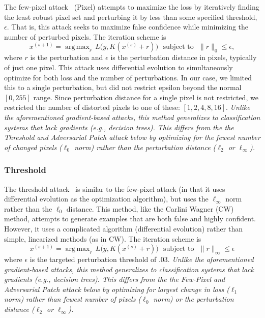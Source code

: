 \documentclass[journal]{IEEEtran}
\DeclareMathOperator*{\argmax}{arg\,max}
\newcommand{\cm}[1]{\textit{{\color{blue}#1}}}
\begin{document}
The few-pixel attack~\cite{pixelattack} (Pixel) attempts to maximize the loss by iteratively finding the least robust pixel set and perturbing it by less than some specified threshold, $\epsilon$. 
That is, this attack seeks to maximize false confidence while minimizing the number of perturbed pixels.
The iteration scheme is
$$
    x^{(s+1)} = \argmax_r \, L\big(y, K(x^{(s)} + r)\big) \text{~~subject~to~~}  \|r\|_0 \leq \epsilon,
$$
where $r$ is the perturbation and $\epsilon$ is the perturbation distance in pixels, typically of just one pixel. This attack uses differential evolution to simultaneously optimize for both loss and the number of perturbations. In our case, we limited this to a single perturbation, but did not restrict epsilon beyond the normal $[0, 255]$ range. Since perturbation distance for a single pixel is not restricted, we restricted the number of distorted pixels to one of these: $[1,2,4,8, 16]$. \cm{Unlike the aforementioned gradient-based attacks, this method generalizes to classification systems that lack gradients (\textit{e.g.}, decision trees). This differs from the the \textit{Threshold} and \textit{Adversarial Patch} attack below by optimizing for the fewest number of changed pixels ($\ell_0$ norm) rather than the perturbation distance ($\ell_2$ or $\ell_{\infty}$).}

\subsubsection{Threshold}
The threshold attack~\cite{pixelattack} is similar to the few-pixel attack (in that it uses differential evolution as the optimization algorithm), but uses the $\ell_{\infty}$ norm rather than the $\ell_0$ distance. This method, like the Carlini Wagner (CW) method, attempts to generate examples that are both false and highly confident. However, it uses a complicated algorithm (differential evolution) rather than simple, linearized methods (as in CW). The iteration scheme is
$$
    x^{(s+1)} = \argmax_r \, L\big(y, K(x^{(s)} + r)\big) \text{~~subject~to~~}  \|r\|_{\infty} \leq \epsilon
$$
where $\epsilon$ is the targeted perturbation threshold of .03. \cm{Unlike the aforementioned gradient-based attacks, this method generalizes to classification systems that lack gradients (\textit{e.g.}, decision trees). This differs from the the \textit{Few-Pixel} and \textit{Adversarial Patch} attack below by optimizing for largest change in loss ($\ell_{1}$ norm) rather than fewest number of pixels ($\ell_{0}$ norm) or the perturbation distance ($\ell_2$ or $\ell_{\infty}$). }
\end{document}

